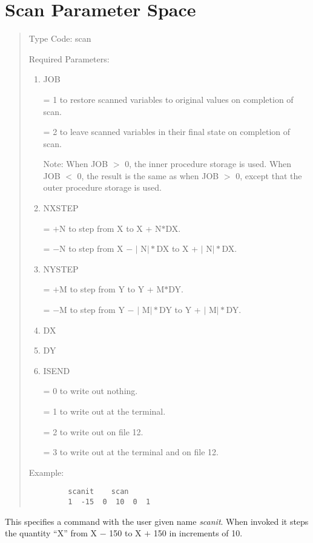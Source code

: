 \section{Scan Parameter Space}
\begin{quotation}
\noindent     Type Code:  scan
\vspace{5mm}

\noindent Required Parameters:
\begin{enumerate}
       \item  JOB

              = 1 to restore scanned variables to original values on
completion of scan.

               = 2 to leave scanned variables in their final state on
completion of scan.

               Note:  When JOB $>$ 0, the inner procedure storage is
used.  When JOB $<$ 0, the result is the same as when JOB $>$ 0, except
that the outer procedure storage is used.

        \item  NXSTEP

               = $+$N to step from X to X + N$\ast$DX.

               = $-$N to step from X $-$ $\mid$ N$\mid \ast$DX to X + $\mid$ N$\mid \ast$DX.

        \item  NYSTEP

               = $+$M to step from Y to Y + M$\ast$DY.

               = $-$M to step from Y $-$ $\mid$ M$\mid \ast$DY to Y + $\mid$ M$\mid \ast$DY.

        \item  DX

        \item  DY

        \item  ISEND

               = 0 to write out nothing.

               = 1 to write out at the terminal.

               = 2 to write out on file 12.

               = 3 to write out at the terminal and on file 12.
\end{enumerate}
\vspace{5mm}
\noindent Example:
\begin{verbatim}
         scanit    scan
         1  -15  0  10  0  1
\end{verbatim}
\end{quotation}
This specifies a command with the user given name {\em scanit}.  When invoked it steps the quantity ``X'' from X $-$ 150 to X $+$ 150 in increments of 10.

